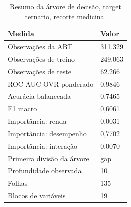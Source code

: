 \begin{table}
\caption{Resumo da árvore de decisão, target ternario, recorte medicina.}
\label{tab:tabela_treeClassification_ternario_recorte_medicina_principal_holdout_80_20_e5}
\begin{tabular}{ll}
\toprule
Medida & Valor \\
\midrule
Observações da ABT & 311.329 \\
Observações de treino & 249.063 \\
Observações de teste & 62.266 \\
ROC-AUC OVR ponderado & 0,9846 \\
Acurácia balanceada & 0,7465 \\
F1 macro & 0,6061 \\
Importância: renda & 0,0031 \\
Importância: desempenho & 0,7702 \\
Importância: interação & 0,0070 \\
Primeira divisão da árvore & gap \\
Profundidade observada & 10 \\
Folhas & 135 \\
Blocos de variáveis & 19 \\
\bottomrule
\end{tabular}
\end{table}
